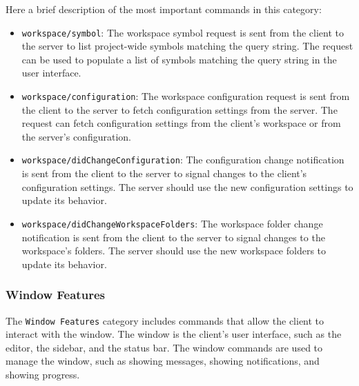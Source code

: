 Here a brief description of the most important commands in this category:
\begin{itemize}
    \item \texttt{workspace/symbol}: The workspace symbol request is sent from the client to the server to list project-wide symbols matching the query string. The request can be used to populate a list of symbols matching the query string in the user interface.
    \item \texttt{workspace/configuration}: The workspace configuration request is sent from the client to the server to fetch configuration settings from the server. The request can fetch configuration settings from the client's workspace or from the server's configuration.
    \item \texttt{workspace/didChangeConfiguration}: The configuration change notification is sent from the client to the server to signal changes to the client's configuration settings. The server should use the new configuration settings to update its behavior.
    \item \texttt{workspace/didChangeWorkspaceFolders}: The workspace folder change notification is sent from the client to the server to signal changes to the workspace's folders. The server should use the new workspace folders to update its behavior.
\end{itemize}

\subsubsection{Window Features}\label{subsec:WindowFeatures}

The \texttt{Window Features} category includes commands that allow the client to interact with the window. The window is the client's user interface, such as the editor, the sidebar, and the status bar. The window commands are used to manage the window, such as showing messages, showing notifications, and showing progress.

